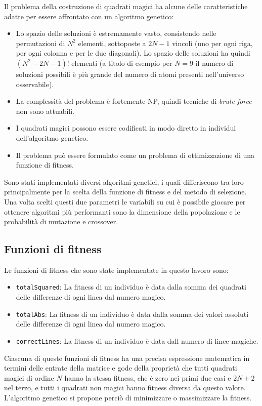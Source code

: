\documentclass[italian,twoside,twocolumn]{article}
\begin{document}
\noindent
Il problema della costruzione di quadrati magici ha alcune delle caratteristiche adatte per essere affrontato con un algoritmo genetico:
\begin{itemize}
	\item Lo spazio delle soluzioni è estremamente vasto, consistendo nelle permutazioni di $ N^2 $ elementi, sottoposte a $ 2 N - 1 $ vincoli (uno per ogni riga, per ogni colonna e per le due diagonali). Lo spazio delle soluzioni ha quindi $ (N^2 - 2N - 1)! $ elementi (a titolo di esempio per $ N = 9 $ il numero di soluzioni possibili è più grande del numero di atomi presenti nell'universo osservabile). 
	\item La complessità del problema è fortemente NP, quindi tecniche di \emph{brute force} non sono attuabili.
	\item I quadrati magici possono essere codificati in modo diretto in individui dell'algoritmo genetico.
	\item Il problema può essere formulato come un problema di ottimizzazione di una funzione di fitness.
\end{itemize}
Sono stati implementati diversi algoritmi genetici, i quali differiscono tra loro principalmente per la scelta della funzione di fitness e del metodo di selezione. Una volta scelti questi due parametri le variabili su cui è possibile giocare per ottenere algoritmi più performanti sono la dimensione della popolazione e le probabilità di mutazione e crossover. 

\subsection{Funzioni di fitness}
Le funzioni di fitness che sono state implementate in questo lavoro sono: 
\begin{itemize}
	\item \texttt{totalSquared}: La fitness di un individuo è data dalla somma dei quadrati delle differenze di ogni linea dal numero magico.
	\item \texttt{totalAbs}: La fitness di un individuo è data dalla somma dei valori assoluti delle differenze di ogni linea dal numero magico.
	\item \texttt{correctLines}: La fitness di un individuo è data dall numero di linee magiche. 
\end{itemize}
Ciascuna di queste funzioni di fitness ha una precisa espressione matematica in termini delle entrate della matrice e gode della proprietà che tutti quadrati magici di ordine $ N $ hanno la stessa fitness, che è zero nei primi due casi e $ 2N + 2 $ nel terzo, e tutti i quadrati non magici hanno fitness diversa da questo valore. L'algoritmo genetico si propone perciò di minimizzare o massimizzare la fitness.
\end{document}
